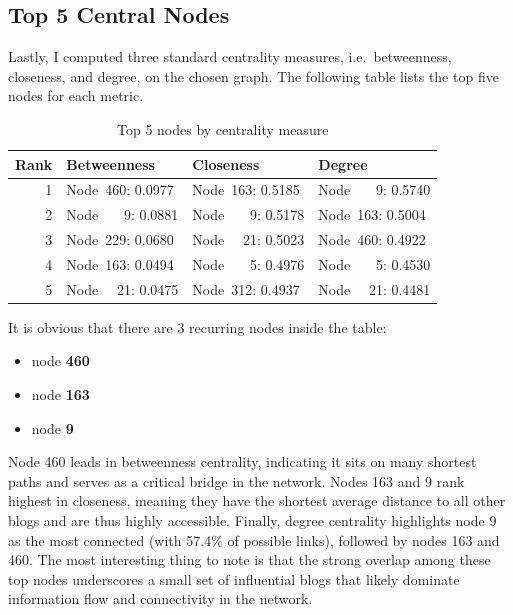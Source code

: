 \documentclass{article}
\begin{document}
\subsection{Top 5 Central Nodes}
\label{sec:top5centrality}
Lastly, I computed three standard centrality measures, i.e.\ betweenness, closeness, and degree, on the chosen graph. The following table lists the top five nodes for each metric.

\begin{table}[H]
  \centering
  \caption{Top 5 nodes by centrality measure}
  \label{tab:top5-centrality}
  \begin{tabular}{r l l l}
    \toprule
    \textbf{Rank} & \textbf{Betweenness} & \textbf{Closeness} & \textbf{Degree} \\
    \midrule
    1 & Node~460: 0.0977 & Node~163: 0.5185 & Node~~~ 9:   0.5740 \\
    2 & Node ~~~9: 0.0881 & Node~~~ 9: 0.5178 & Node~163: 0.5004 \\
    3 & Node~229: 0.0680 & Node~~ 21: 0.5023 & Node~460: 0.4922 \\
    4 & Node~163: 0.0494 & Node~~~ 5: 0.4976 & Node~~~ 5: 0.4530 \\
    5 & Node~~ 21: 0.0475 & Node~312: 0.4937 & Node~~ 21: 0.4481 \\
    \bottomrule
  \end{tabular}
\end{table}

It is obvious that there are 3 recurring nodes inside the table: 
\begin{itemize}
  \item node \textbf{460}
  \item node \textbf{163}
  \item node \textbf{9}
\end{itemize}

Node 460 leads in betweenness centrality, indicating it sits on many shortest paths and serves as a critical bridge in the network. Nodes 163 and 9 rank highest in closeness, meaning they have the shortest average distance to all other blogs and are thus highly accessible. Finally, degree centrality highlights node 9 as the most connected (with 57.4\% of possible links), followed by nodes 163 and 460. The most interesting thing to note is that the strong overlap among these top nodes underscores a small set of influential blogs that likely dominate information flow and connectivity in the network.

\vspace{0.5cm}
\end{document}
